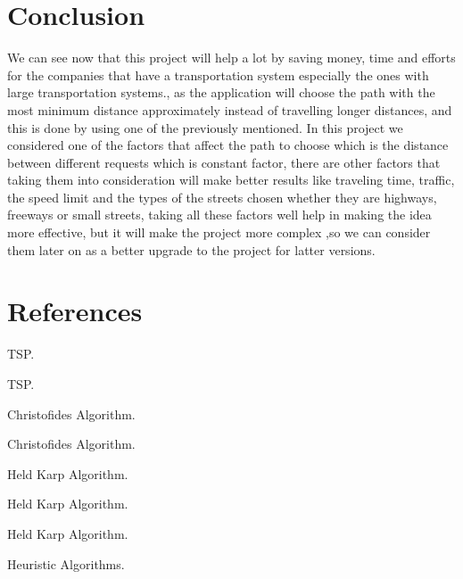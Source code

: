 \documentclass[12pt]{article}
\begin{document}
\section{\sc Conclusion}
We can see now that this project will help a lot by saving money, time and efforts for the companies that have a transportation system especially the ones with large transportation systems., as the application will choose the path with the most minimum distance approximately instead of travelling longer distances, and this is done by using one of the previously mentioned. 
In this project we considered one of the factors that affect the path to choose which is the distance between different requests which is constant factor, there are other factors that taking them into consideration will make better results like traveling time, traffic, the speed limit and the types of the streets chosen whether they are highways, freeways or small streets, taking all these factors well help in making the idea more effective, but it will make the project more complex ,so we can consider them later on as a better upgrade to the project for latter versions.


\newpage

\section{\sc References}

\begin{thebibliography}{10}


TSP.

TSP.

Christofides Algorithm.

Christofides Algorithm.

Held Karp Algorithm.

Held Karp Algorithm.

Held Karp Algorithm.

Heuristic Algorithms.

\end{thebibliography}
\end{document}

